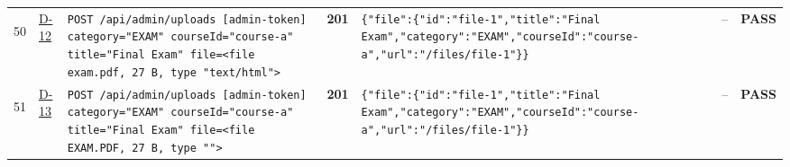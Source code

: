 \documentclass[10pt,a4paper]{article}
\begin{document}
\begin{landscape}
\begin{longtable}{@{}P{0.6cm}P{0.9cm}P{8.5cm}P{1.0cm}P{6.2cm}P{4.2cm}P{1.1cm}@{}}
\hypertarget{call50}{50} & \hyperlink{test-D-12}{D-12} & \texttt{POST /\allowbreak{}api/\allowbreak{}admin/\allowbreak{}uploads [admin-\allowbreak{}token] category=\allowbreak{}"\allowbreak{}EXAM"\allowbreak{} courseId=\allowbreak{}"\allowbreak{}course-\allowbreak{}a"\allowbreak{} title=\allowbreak{}"\allowbreak{}Final Exam"\allowbreak{} file=\allowbreak{}<file exam.\allowbreak{}pdf,\allowbreak{} 27 B,\allowbreak{} type "\allowbreak{}text/\allowbreak{}html"\allowbreak{}>} & \textcolor{passgreen}{\textbf{201}} & \texttt{\{"\allowbreak{}file"\allowbreak{}:\allowbreak{}\{"\allowbreak{}id"\allowbreak{}:\allowbreak{}"\allowbreak{}file-\allowbreak{}1"\allowbreak{},\allowbreak{}"\allowbreak{}title"\allowbreak{}:\allowbreak{}"\allowbreak{}Final Exam"\allowbreak{},\allowbreak{}"\allowbreak{}category"\allowbreak{}:\allowbreak{}"\allowbreak{}EXAM"\allowbreak{},\allowbreak{}"\allowbreak{}courseId"\allowbreak{}:\allowbreak{}"\allowbreak{}course-\allowbreak{}a"\allowbreak{},\allowbreak{}"\allowbreak{}url"\allowbreak{}:\allowbreak{}"\allowbreak{}/\allowbreak{}files/\allowbreak{}file-\allowbreak{}1"\allowbreak{}\}\}} & -- & \textcolor{passgreen}{\textbf{PASS}} \\
\hypertarget{call51}{51} & \hyperlink{test-D-13}{D-13} & \texttt{POST /\allowbreak{}api/\allowbreak{}admin/\allowbreak{}uploads [admin-\allowbreak{}token] category=\allowbreak{}"\allowbreak{}EXAM"\allowbreak{} courseId=\allowbreak{}"\allowbreak{}course-\allowbreak{}a"\allowbreak{} title=\allowbreak{}"\allowbreak{}Final Exam"\allowbreak{} file=\allowbreak{}<file EXAM.\allowbreak{}PDF,\allowbreak{} 27 B,\allowbreak{} type "\allowbreak{}"\allowbreak{}>} & \textcolor{passgreen}{\textbf{201}} & \texttt{\{"\allowbreak{}file"\allowbreak{}:\allowbreak{}\{"\allowbreak{}id"\allowbreak{}:\allowbreak{}"\allowbreak{}file-\allowbreak{}1"\allowbreak{},\allowbreak{}"\allowbreak{}title"\allowbreak{}:\allowbreak{}"\allowbreak{}Final Exam"\allowbreak{},\allowbreak{}"\allowbreak{}category"\allowbreak{}:\allowbreak{}"\allowbreak{}EXAM"\allowbreak{},\allowbreak{}"\allowbreak{}courseId"\allowbreak{}:\allowbreak{}"\allowbreak{}course-\allowbreak{}a"\allowbreak{},\allowbreak{}"\allowbreak{}url"\allowbreak{}:\allowbreak{}"\allowbreak{}/\allowbreak{}files/\allowbreak{}file-\allowbreak{}1"\allowbreak{}\}\}} & -- & \textcolor{passgreen}{\textbf{PASS}} \\

\end{longtable}
\end{landscape}
\end{document}
